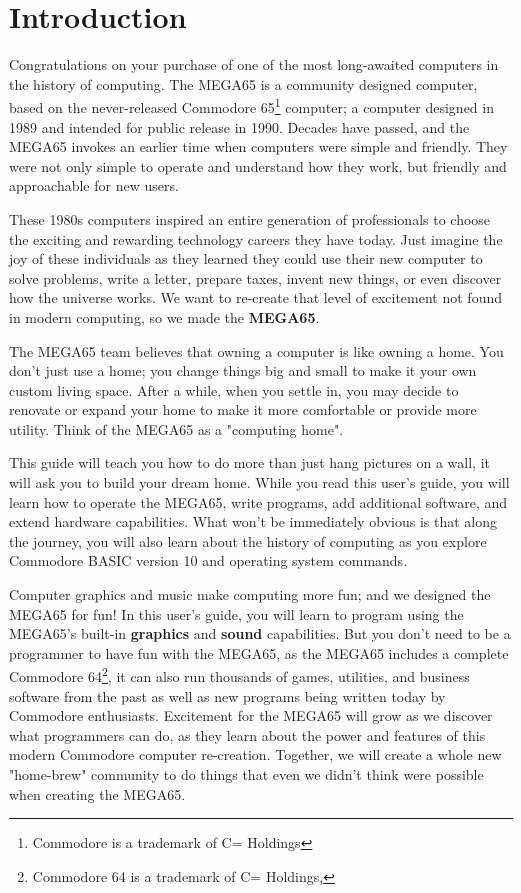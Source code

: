 \chapter{Introduction}

Congratulations on your purchase of one of the most long-awaited computers in the history of computing. The MEGA65 is a community designed computer, based on the never-released Commodore{\textregistered} 65\footnote{Commodore is a trademark of C= Holdings} computer; a computer designed in 1989 and intended for public release in 1990. Decades have passed, and the MEGA65 invokes an earlier time when computers were simple and friendly. They were not only simple to operate and understand how they work, but friendly and approachable for new users.

These 1980s computers inspired an entire generation of professionals to choose the exciting and rewarding technology careers they have today. Just imagine the joy of these individuals as they learned they could use their new computer to solve problems, write a letter, prepare taxes, invent new things, or even discover how the universe works. We want to re-create that level of excitement not found in modern computing, so we made the {\bf MEGA65}.

The MEGA65 team believes that owning a computer is like owning a home. You don't just use a home; you change things big and small to make it your own custom living space. After a while, when you settle in, you may decide to renovate or expand your home to make it more comfortable or provide more utility. Think of the MEGA65 as a "computing home".

This guide will teach you how to do more than just hang pictures on a wall, it will ask you to build your dream home. While you read this user's guide, you will learn how to operate the MEGA65, write programs, add additional software, and extend hardware capabilities. What won't be immediately obvious is that along the journey, you will also learn about the history of computing as you explore Commodore BASIC version 10 and operating system commands.

Computer graphics and music make computing more fun; and we designed the MEGA65 for fun! In this user's guide, you will learn to program using the MEGA65's built-in {\bf graphics} and {\bf sound} capabilities. But you don't need to be a programmer to have fun with the MEGA65, as the MEGA65 includes a complete Commodore{\textregistered} 64{\texttrademark}\footnote{Commodore 64 is a trademark of C= Holdings, }, it can also run thousands of games, utilities, and business software from the past as well as new programs being written today by Commodore enthusiasts. Excitement for the MEGA65 will grow as we discover what programmers can do, as they learn about the power and features of this modern Commodore computer re-creation. Together, we will create a whole new "home-brew" community to do things that even we didn't think were possible when creating the MEGA65.

